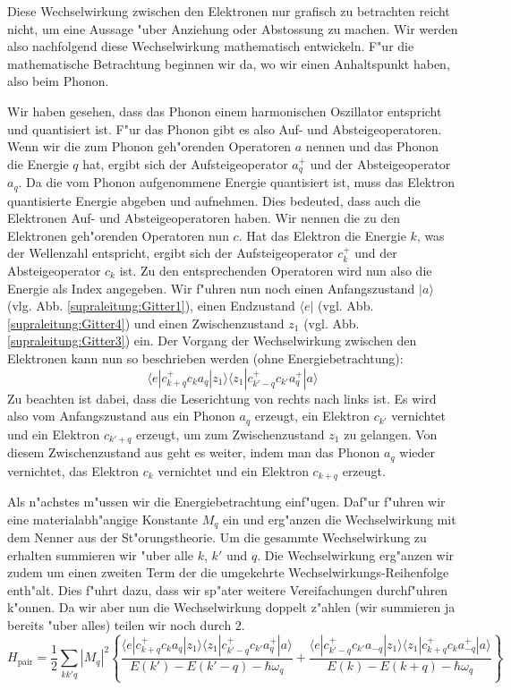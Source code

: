 \begin{refsection}
Diese Wechselwirkung zwischen den Elektronen nur grafisch zu betrachten reicht nicht,
um eine Aussage "uber Anziehung oder Abstossung zu machen.
Wir werden also nachfolgend diese Wechselwirkung mathematisch entwickeln.
F"ur die mathematische Betrachtung beginnen wir da, wo wir einen Anhaltspunkt haben, also beim Phonon.

Wir haben gesehen, dass das Phonon einem harmonischen Oszillator entspricht und quantisiert ist.
F"ur das Phonon gibt es also Auf- und Absteigeoperatoren.
Wenn wir die zum Phonon geh"orenden Operatoren $a$ nennen und das Phonon die Energie $q$ hat,
ergibt sich der Aufsteigeoperator
$a^+_q$ und der Absteigeoperator $a_q$.
Da die vom Phonon aufgenommene Energie quantisiert ist, muss das Elektron quantisierte Energie
abgeben und aufnehmen.
Dies bedeuted, dass auch die Elektronen Auf- und Absteigeoperatoren haben.
Wir nennen die zu den Elektronen geh"orenden Operatoren nun $c$. Hat das Elektron die Energie $k$,
was der Wellenzahl entspricht, ergibt sich der Aufsteigeoperator $c^+_k$ und der
Absteigeoperator $c_k$ ist.
Zu den entsprechenden Operatoren wird nun also die Energie als Index angegeben.
Wir f"uhren nun noch einen Anfangszustand $|a\rangle$ (vlg. Abb. \ref{supraleitung:Gitter1}),
einen Endzustand $\langle e|$ (vgl. Abb. \ref{supraleitung:Gitter4}) und
einen Zwischenzustand $z_1$ (vgl. Abb. \ref{supraleitung:Gitter3}) ein.
Der Vorgang der Wechselwirkung zwischen den Elektronen kann nun so beschrieben werden
(ohne Energiebetrachtung):
\begin{equation}
\langle e|c^+_{k+q} c_k a_q |z_1\rangle\langle z_1| c^+_{k'-q} c_{k'} a^+_q |a\rangle
\label{supraleitung:WechelwirkungOE}
\end{equation}
Zu beachten ist dabei, dass die Leserichtung von rechts nach links ist.
Es wird also vom Anfangszustand aus ein Phonon $a_q$ erzeugt, ein Elektron $c_{k'}$ vernichtet
und ein Elektron $c_{k'+q}$ erzeugt, um zum Zwischenzustand $z_1$ zu gelangen.
Von diesem Zwischenzustand aus geht es weiter, indem man das Phonon $a_q$ wieder vernichtet,
das Elektron $c_k$ vernichtet und ein Elektron $c_{k+q}$ erzeugt.

Als n"achstes m"ussen wir die Energiebetrachtung einf"ugen.
Daf"ur f"uhren wir eine materialabh"angige Konstante $M_q$ ein und erg"anzen die
Wechselwirkung mit dem Nenner aus der St"orungstheorie.
Um die gesammte Wechselwirkung zu erhalten summieren wir "uber alle $k$, $k'$ und $q$.
Die Wechselwirkung erg"anzen wir zudem um einen zweiten Term der die umgekehrte
Wechselwirkungs-Reihenfolge enth"alt.
Dies f"uhrt dazu, dass wir sp"ater weitere Vereifachungen durchf"uhren k"onnen.
Da wir aber nun die Wechselwirkung doppelt z"ahlen (wir summieren ja bereits "uber alles)
teilen wir noch durch $2$.
\begin{equation}
H_{\text{pair}}=
\frac{1}{2}
\sum \limits_{kk'q} |M_q|^2
\left\{
\frac
{\langle e|c^+_{k+q} c_k a_q |z_1\rangle\langle z_1| c^+_{k'-q} c_{k'} a^+_q |a\rangle }
{E(k')-E(k'-q)-\hbar\omega_q}
+
\frac
{\langle e|c^+_{k'-q} c_{k'} a_{-q}|z_1\rangle\langle z_1| c^+_{k+q} c_k a^+_{-q} |a\rangle }
{E(k)-E(k+q)-\hbar\omega_q}
\right\}
\label{supraleitung:WechelwirkungME}
\end{equation}


\end{refsection}
